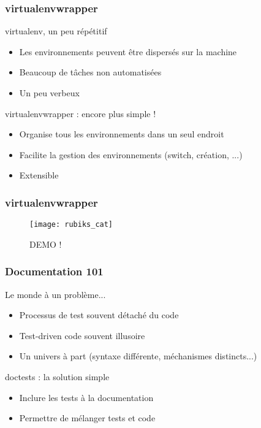 \documentclass{beamer}
\begin{document}
\begin{frame}
  \frametitle{virtualenvwrapper}

  \begin{block}{virtualenv, un peu répétitif}
    \begin{itemize}
    \item Les environnements peuvent être dispersés sur la machine
    \item Beaucoup de tâches non automatisées
    \item Un peu verbeux
    \end{itemize}
  \end{block}

  \pause

  \begin{block}{virtualenvwrapper : encore plus simple !}
    \begin{itemize}
    \item Organise tous les environnements dans un seul endroit
    \item Facilite la gestion des environnements (switch, création, ...)
    \item Extensible
    \end{itemize}
  \end{block}

\end{frame}

\begin{frame}
  \frametitle{virtualenvwrapper}

  \begin{figure}[!h]
    \centering
    \texttt{[image: rubiks\_cat]}
    \caption{DEMO !}
    \label{fig:virtualenvwrapperdemo}
  \end{figure}

\end{frame}

\begin{frame}
  \frametitle{Documentation 101}

  \begin{block}{Le monde à un problème...}
    \begin{itemize}
    \item Processus de test souvent détaché du code
    \item Test-driven code souvent illusoire
    \item Un univers à part (syntaxe différente, méchanismes
      distincts...)
    \end{itemize}
  \end{block}

  \pause

  \begin{block}{doctests : la solution simple}
    \begin{itemize}
    \item Inclure les tests à la documentation
    \item Permettre de mélanger tests et code
    \end{itemize}
  \end{block}

\end{frame}
\end{document}
